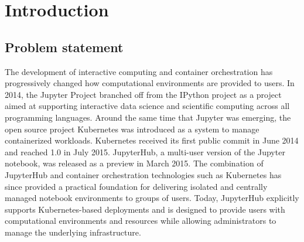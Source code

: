 \chapter{Introduction}

\section{Problem statement}

The development of interactive computing and container orchestration has progressively changed how computational environments are provided to users. In 2014, the Jupyter Project branched off from the IPython project as a project aimed at supporting interactive data science and scientific computing across all programming languages. Around the same time that Jupyter was emerging, the open source project Kubernetes was introduced as a system to manage containerized workloads. Kubernetes received its first public commit in June 2014 and reached 1.0 in July 2015. JupyterHub, a multi-user version of the Jupyter notebook, was released as a preview in March 2015. The combination of JupyterHub and container orchestration technologies such as Kubernetes has since provided a practical foundation for delivering isolated and centrally managed notebook environments to groups of users. Today, JupyterHub explicitly supports Kubernetes-based deployments and is designed to provide users with computational environments and resources while allowing administrators to manage the underlying infrastructure.

